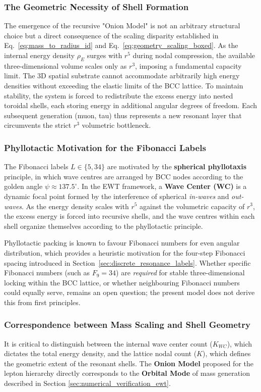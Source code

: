 \documentclass[10pt,a4paper]{article}
\begin{document}
\subsubsection*{The Geometric Necessity of Shell Formation}
\label{sec:geom_shell_formation}
The emergence of the recursive "Onion Model" is not an arbitrary structural choice but a direct consequence of the scaling disparity established in Eq.~\ref{eq:mass_to_radius_id} and Eq.~\ref{eq:geometry_scaling_boxed}. As the internal energy density $\rho_E$ surges with $r^5$ during nodal compression, the available three-dimensional volume scales only as $r^3$, imposing a fundamental capacity limit. The 3D spatial substrate cannot accommodate arbitrarily high energy densities without exceeding the elastic limits of the BCC lattice. To maintain stability, the system is forced to redistribute the excess energy into nested toroidal shells, each storing energy in additional angular degrees of freedom. Each subsequent generation (muon, tau) thus represents a new resonant layer that circumvents the strict $r^3$ volumetric bottleneck.

\subsubsection*{Phyllotactic Motivation for the Fibonacci Labels}

The Fibonacci labels $L \in \{5, 34\}$ are motivated by the
\textbf{spherical phyllotaxis} principle, in which wave centres are
arranged by BCC nodes according to the golden angle
$\psi \approx 137.5^\circ$. In the EWT framework, a \textbf{Wave Center
	(WC)} is a dynamic focal point formed by the interference of spherical
\textit{in-waves} and \textit{out-waves}. As the energy density scales
with $r^5$ against the volumetric capacity of $r^3$, the excess energy
is forced into recursive shells, and the wave centres within each shell
organize themselves according to the phyllotactic principle.

Phyllotactic packing is known to favour Fibonacci numbers for even
angular distribution, which provides a heuristic motivation for the
four-step Fibonacci spacing introduced in
Section~\ref{sec:discrete_resonance_labels}. Whether specific Fibonacci
numbers (such as $F_9 = 34$) are \emph{required} for stable
three-dimensional locking within the BCC lattice, or whether
neighbouring Fibonacci numbers could equally serve, remains an open
question; the present model does not derive this from first principles.

\subsubsection{Correspondence between Mass Scaling and Shell Geometry}
It is critical to distinguish between the internal wave center count ($K_{WC}$), which dictates the total energy density, and the lattice nodal count ($K$), which defines the geometric extent of the resonant shells. The \textbf{Onion Model} proposed for the lepton hierarchy directly corresponds to the \textbf{Orbital Mode} of mass generation described in Section \ref{sec:numerical_verification_ewt}. 
\end{document}
